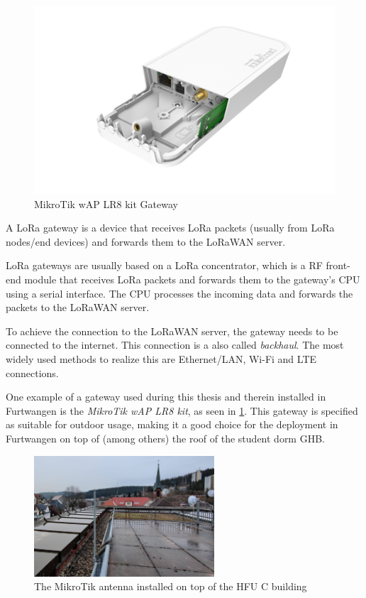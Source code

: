\begin{figure}[h]
    \centering
    \includegraphics[width=.6\textwidth]{pictures/hardware/gateways/mikrotik-lr8-kit.png}
    \caption{MikroTik wAP LR8 kit Gateway~\protect\cite{the_things_industries_bv_lorawan_nodate}}\label{pic:mikrotik-lr8-kit-gateway}
\end{figure}

A \ac{LoRa} gateway is a device that receives \ac{LoRa} packets (usually from \ac{LoRa} nodes/end devices) and forwards them to the \ac{LoRaWAN} server.

\ac{LoRa} gateways are usually based on a \ac{LoRa} concentrator, which is a \ac{RF} front-end module that receives \ac{LoRa} packets and forwards them to the gateway's \ac{CPU} using a serial interface.
The \ac{CPU} processes the incoming data and forwards the packets to the \ac{LoRaWAN} server.

To achieve the connection to the \ac{LoRaWAN} server, the gateway needs to be connected to the internet.
This connection is a also called \emph{backhaul}.
The most widely used methods to realize this are Ethernet/\ac{LAN}, Wi-Fi and \ac{LTE} connections. 

One example of a gateway used during this thesis and therein installed in Furtwangen is the \emph{MikroTik wAP LR8 kit}, as seen in \cref{pic:mikrotik-lr8-kit-gateway}.
This gateway is specified as suitable for outdoor usage, making it a good choice for the deployment in Furtwangen on top of (among others) the roof of the student dorm \ac{GHB}.

\begin{figure}[h]
    \centering
    \includegraphics[width=0.6\textwidth]{pictures/hardware/gateway-deployment/mikrotik-antenna-c-building.jpg}
    \caption{The MikroTik antenna installed on top of the \ac{HFU} C building}\label{pic:mikrotik-antenna-c-building}
\end{figure}

